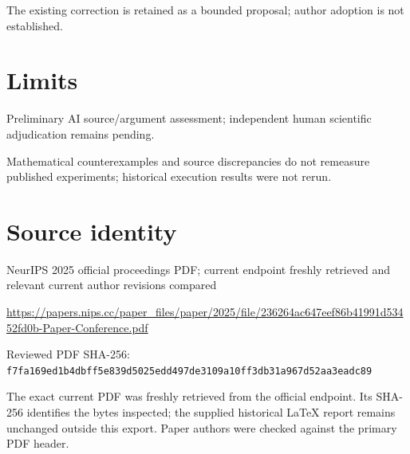 \documentclass[11pt]{article}
\begin{document}
The existing correction is retained as a bounded proposal; author adoption is not established.

\section*{Limits}

Preliminary AI source/argument assessment; independent human scientific adjudication remains pending.\par

Mathematical counterexamples and source discrepancies do not remeasure published experiments; historical execution results were not rerun.\par

\section*{Source identity}

NeurIPS 2025 official proceedings PDF; current endpoint freshly retrieved and relevant current author revisions compared

\url{https://papers.nips.cc/paper_files/paper/2025/file/236264ac647eef86b41991d53452fd0b-Paper-Conference.pdf}

Reviewed PDF SHA-256: \nolinkurl{f7fa169ed1b4dbff5e839d5025edd497de3109a10ff3db31a967d52aa3eadc89}

The exact current PDF was freshly retrieved from the official endpoint. Its SHA-256 identifies the bytes inspected; the supplied historical LaTeX report remains unchanged outside this export. Paper authors were checked against the primary PDF header.
\end{document}

